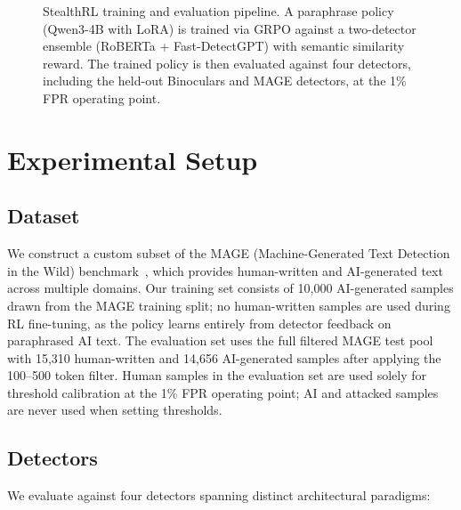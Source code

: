 \documentclass[11pt]{article}
\begin{document}
\begin{figure}[H]
\centering
\resizebox{\textwidth}{!}{}
\caption{StealthRL training and evaluation pipeline. A paraphrase policy (Qwen3-4B with LoRA) is trained via GRPO against a two-detector ensemble (RoBERTa + Fast-DetectGPT) with semantic similarity reward. The trained policy is then evaluated against four detectors, including the held-out Binoculars and MAGE detectors, at the 1\% FPR operating point.}
\label{fig:pipeline}
\end{figure}

\section{Experimental Setup}
\label{sec:setup}

\subsection{Dataset}

We construct a custom subset of the MAGE (Machine-Generated Text Detection in the Wild) benchmark~\cite{li2024magemachinegeneratedtextdetection}, which provides human-written and AI-generated text across multiple domains. Our training set consists of 10,000 AI-generated samples drawn from the MAGE training split; no human-written samples are used during RL fine-tuning, as the policy learns entirely from detector feedback on paraphrased AI text. The evaluation set uses the full filtered MAGE test pool with 15,310 human-written and 14,656 AI-generated samples after applying the 100--500 token filter. Human samples in the evaluation set are used solely for threshold calibration at the 1\% FPR operating point; AI and attacked samples are never used when setting thresholds.

\subsection{Detectors}

We evaluate against four detectors spanning distinct architectural paradigms:
\end{document}
